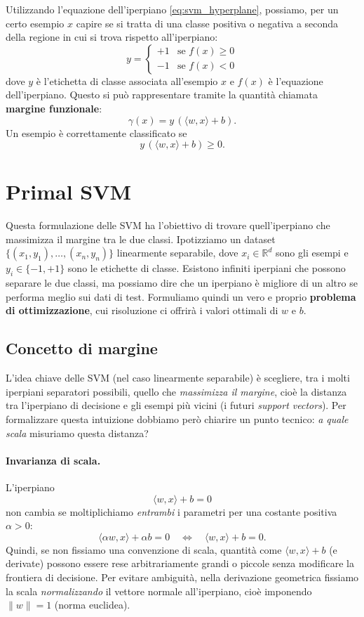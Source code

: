 Utilizzando l'equazione dell'iperpiano \eqref{eq:svm_hyperplane}, possiamo, per un certo esempio $x$ capire se si tratta di una classe positiva o negativa a seconda della regione in cui si trova rispetto all'iperpiano:
\[
y = 
\begin{cases}
	+1 & \text{se } f(x) \geq 0 \\
	-1 & \text{se } f(x) < 0
\end{cases}
\]
dove $y$ è l'etichetta di classe associata all'esempio $x$ e $f(x)$ è l'equazione dell'iperpiano. Questo si può rappresentare tramite la quantità chiamata \textbf{margine funzionale}:
\begin{equation}
\gamma(x) = y \, (\langle w, x \rangle + b).
\label{eq:svm_functional_margin}
\end{equation}
Un esempio è correttamente classificato se
\[
y \, (\langle w, x \rangle + b) \ge 0.
\]

\section{Primal SVM}
Questa formulazione delle SVM ha l'obiettivo di trovare quell'iperpiano che massimizza il margine tra le due classi. Ipotizziamo un dataset $\{(x_1, y_1), \ldots, (x_n, y_n)\}$ linearmente separabile, dove $x_i \in \mathbb{R}^d$ sono gli esempi e $y_i \in \{-1, +1\}$ sono le etichette di classe. Esistono infiniti iperpiani che possono separare le due classi, ma possiamo dire che un iperpiano è migliore di un altro se performa meglio sui dati di test. Formuliamo quindi un vero e proprio \textbf{problema di ottimizzazione}, cui risoluzione ci offrirà i valori ottimali di $w$ e $b$.

\subsection{Concetto di margine}\label{sec:svm_margin}
L’idea chiave delle SVM (nel caso linearmente separabile) è scegliere, tra i molti iperpiani separatori possibili, quello che \emph{massimizza il margine}, cioè la distanza tra l’iperpiano di decisione e gli esempi più vicini (i futuri \emph{support vectors}). Per formalizzare questa intuizione dobbiamo però chiarire un punto tecnico: \emph{a quale scala} misuriamo questa distanza?

\paragraph{Invarianza di scala.}
L’iperpiano
\[
\langle w, x\rangle + b = 0
\]
non cambia se moltiplichiamo \emph{entrambi} i parametri per una costante positiva $\alpha>0$:
\[
\langle \alpha w, x\rangle + \alpha b = 0
\quad\Longleftrightarrow\quad
\langle w, x\rangle + b = 0.
\]
Quindi, se non fissiamo una convenzione di scala, quantità come $\langle w,x\rangle+b$ (e derivate) possono essere rese arbitrariamente grandi o piccole senza modificare la frontiera di decisione. Per evitare ambiguità, nella derivazione geometrica fissiamo la scala \emph{normalizzando} il vettore normale all’iperpiano, cioè imponendo $\|w\|=1$ (norma euclidea).

